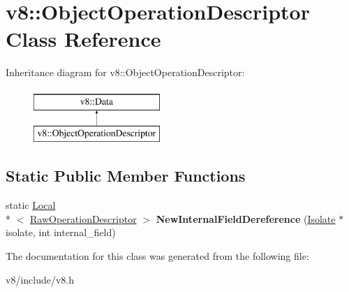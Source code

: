 \hypertarget{classv8_1_1ObjectOperationDescriptor}{\section{v8\-:\-:Object\-Operation\-Descriptor Class Reference}
\label{classv8_1_1ObjectOperationDescriptor}
}
Inheritance diagram for v8\-:\-:Object\-Operation\-Descriptor\-:\begin{figure}[H]
\begin{center}
\leavevmode
\includegraphics[height=2.000000cm]{classv8_1_1ObjectOperationDescriptor}
\end{center}
\end{figure}
\subsection*{Static Public Member Functions}
\begin{DoxyCompactItemize}
\item 
\hypertarget{classv8_1_1ObjectOperationDescriptor_a5268ef439fd9f47190ccaecfd721aa12}{static \hyperlink{classv8_1_1Local}{Local}\\*
$<$ \hyperlink{classv8_1_1RawOperationDescriptor}{Raw\-Operation\-Descriptor} $>$ {\bfseries New\-Internal\-Field\-Dereference} (\hyperlink{classv8_1_1Isolate}{Isolate} $\ast$isolate, int internal\-\_\-field)}\label{classv8_1_1ObjectOperationDescriptor_a5268ef439fd9f47190ccaecfd721aa12}

\end{DoxyCompactItemize}


The documentation for this class was generated from the following file\-:\begin{DoxyCompactItemize}
\item 
v8/include/v8.\-h\end{DoxyCompactItemize}
